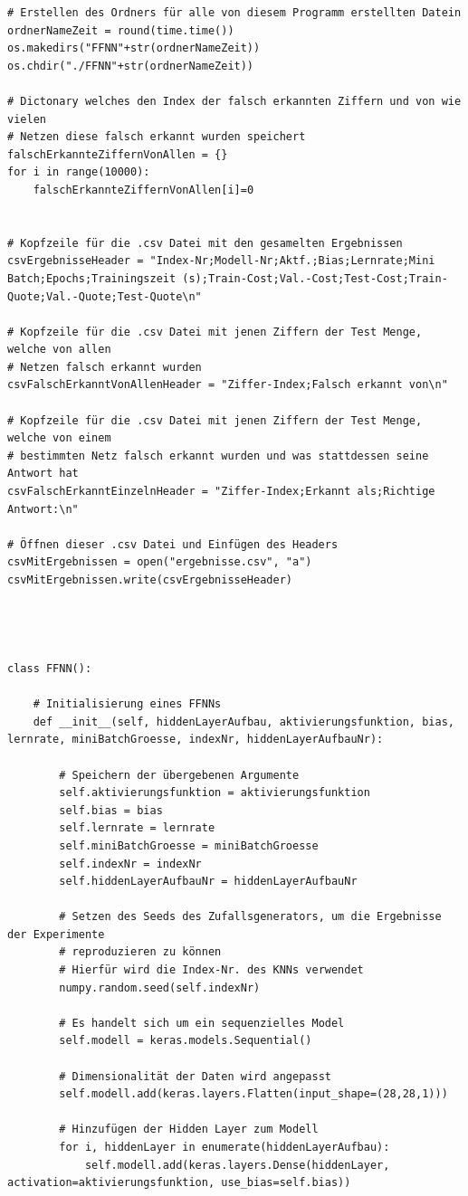 \documentclass[a4paper,12pt,ngerman,oneside]{scrreprt}	%
\begin{document}
{\begin{lstlisting}
# Erstellen des Ordners für alle von diesem Programm erstellten Datein
ordnerNameZeit = round(time.time())
os.makedirs("FFNN"+str(ordnerNameZeit))
os.chdir("./FFNN"+str(ordnerNameZeit))

# Dictonary welches den Index der falsch erkannten Ziffern und von wie vielen
# Netzen diese falsch erkannt wurden speichert
falschErkannteZiffernVonAllen = {}
for i in range(10000):
	falschErkannteZiffernVonAllen[i]=0


# Kopfzeile für die .csv Datei mit den gesamelten Ergebnissen
csvErgebnisseHeader = "Index-Nr;Modell-Nr;Aktf.;Bias;Lernrate;Mini Batch;Epochs;Trainingszeit (s);Train-Cost;Val.-Cost;Test-Cost;Train-Quote;Val.-Quote;Test-Quote\n"

# Kopfzeile für die .csv Datei mit jenen Ziffern der Test Menge, welche von allen
# Netzen falsch erkannt wurden
csvFalschErkanntVonAllenHeader = "Ziffer-Index;Falsch erkannt von\n"

# Kopfzeile für die .csv Datei mit jenen Ziffern der Test Menge, welche von einem
# bestimmten Netz falsch erkannt wurden und was stattdessen seine Antwort hat
csvFalschErkanntEinzelnHeader = "Ziffer-Index;Erkannt als;Richtige Antwort:\n"

# Öffnen dieser .csv Datei und Einfügen des Headers
csvMitErgebnissen = open("ergebnisse.csv", "a")
csvMitErgebnissen.write(csvErgebnisseHeader)




class FFNN():

	# Initialisierung eines FFNNs
	def __init__(self, hiddenLayerAufbau, aktivierungsfunktion, bias, lernrate, miniBatchGroesse, indexNr, hiddenLayerAufbauNr):
	
		# Speichern der übergebenen Argumente
		self.aktivierungsfunktion = aktivierungsfunktion
		self.bias = bias
		self.lernrate = lernrate
		self.miniBatchGroesse = miniBatchGroesse
		self.indexNr = indexNr
		self.hiddenLayerAufbauNr = hiddenLayerAufbauNr
		
		# Setzen des Seeds des Zufallsgenerators, um die Ergebnisse der Experimente
		# reproduzieren zu können
		# Hierfür wird die Index-Nr. des KNNs verwendet
		numpy.random.seed(self.indexNr)
		
		# Es handelt sich um ein sequenzielles Model
		self.modell = keras.models.Sequential()
		
		# Dimensionalität der Daten wird angepasst
		self.modell.add(keras.layers.Flatten(input_shape=(28,28,1)))
		
		# Hinzufügen der Hidden Layer zum Modell
		for i, hiddenLayer in enumerate(hiddenLayerAufbau):
			self.modell.add(keras.layers.Dense(hiddenLayer, activation=aktivierungsfunktion, use_bias=self.bias))
		

\end{lstlisting}}
\end{document}

